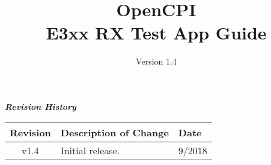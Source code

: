 \iffalse
This file is protected by Copyright. Please refer to the COPYRIGHT file
distributed with this source distribution.

This file is part of OpenCPI <http://www.opencpi.org>

OpenCPI is free software: you can redistribute it and/or modify it under the
terms of the GNU Lesser General Public License as published by the Free Software
Foundation, either version 3 of the License, or (at your option) any later
version.

OpenCPI is distributed in the hope that it will be useful, but WITHOUT ANY
WARRANTY; without even the implied warranty of MERCHANTABILITY or FITNESS FOR A
PARTICULAR PURPOSE. See the GNU Lesser General Public License for more details.

You should have received a copy of the GNU Lesser General Public License along
with this program. If not, see <http://www.gnu.org/licenses/>.
\fi

\def\docTitle{OpenCPI\\ E3xx RX Test App Guide}
\def\docVersion{1.4}

\date{Version \docVersion} %
\title{\docTitle}
\usepackage{graphicx}
\graphicspath{ {figures/} }
\usepackage{textcomp}
\usepackage{listings}


\maketitle
	\begin{center}
	\textit{\textbf{Revision History}}
		\begin{table}[H]
		\label{table:revisions} %
			\begin{tabularx}{\textwidth}{|c|X|l|}
			\hline
			\rowcolor{blue}
			\textbf{Revision} & \textbf{Description of Change} & \textbf{Date} \\
		    \hline
		    v1.4 & Initial release. & 9/2018 \\
			\hline
			\end{tabularx}
		\end{table}
	\end{center}

